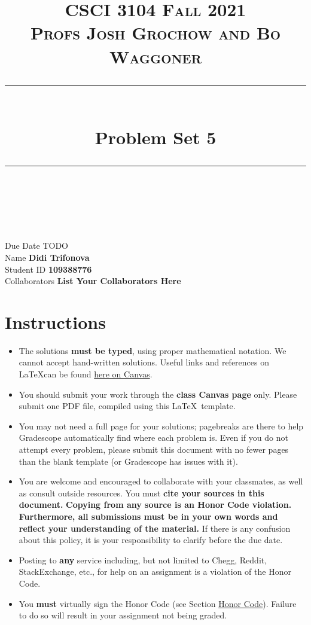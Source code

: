 \documentclass[11pt]{article}
\title{
\normalfont \normalsize 
\textsc{CSCI 3104 Fall 2021 \\ 
Profs Josh Grochow and Bo Waggoner} \\
[10pt] 
\rule{\linewidth}{0.5pt} \\[6pt] 
\huge Problem Set 5 \\
\rule{\linewidth}{2pt}  \\[10pt]
}
\date{}
\theoremstyle{definition}
\theoremstyle{definition}
\theoremstyle{definition}
\begin{document}
\maketitle


\noindent
Due Date \dotfill TODO \\
Name \dotfill \textbf{Didi Trifonova} \\
Student ID \dotfill \textbf{109388776} \\
Collaborators \dotfill \textbf{List Your Collaborators Here}

\tableofcontents

\section*{Instructions}
 \begin{itemize}
	\item The solutions \textbf{must be typed}, using proper mathematical notation. We cannot accept hand-written solutions. Useful links and references on \LaTeX can be found \href{https://canvas.colorado.edu/courses/75824/pages/latex}{here on Canvas}.
	\item You should submit your work through the \textbf{class Canvas page} only. Please submit one PDF file, compiled using this \LaTeX \ template.
	\item You may not need a full page for your solutions; pagebreaks are there to help Gradescope automatically find where each problem is. Even if you do not attempt every problem, please submit this document with no fewer pages than the blank template (or Gradescope has issues with it).

	\item You are welcome and encouraged to collaborate with your classmates, as well as consult outside resources. You must \textbf{cite your sources in this document.} \textbf{Copying from any source is an Honor Code violation. Furthermore, all submissions must be in your own words and reflect your understanding of the material.} If there is any confusion about this policy, it is your responsibility to clarify before the due date. 

	\item Posting to \textbf{any} service including, but not limited to Chegg, Reddit, StackExchange, etc., for help on an assignment is a violation of the Honor Code.

	\item You \textbf{must} virtually sign the Honor Code (see Section \hyperlink{HonorCode}{Honor Code}). Failure to do so will result in your assignment not being graded.
\end{itemize}
\end{document}
